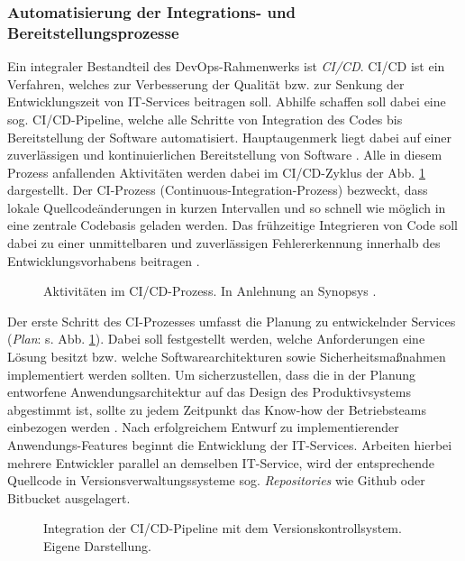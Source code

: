 \subsubsection{Automatisierung der Integrations- und Bereitstellungsprozesse}
\label{sec:CICD}
 Ein integraler Bestandteil des DevOps-Rahmen\-werks ist \textit{\ac{CI/CD}}. CI/CD ist ein Verfahren, welches zur Verbesserung der Qualität bzw. zur Senkung der Entwicklungszeit von IT-Services beitragen soll. Abhilfe schaffen soll dabei eine sog. CI/CD-Pipeline, welche alle Schritte von Integration des Codes  bis Bereitstellung der Software automatisiert. Hauptaugenmerk liegt dabei auf einer zuverlässigen und kontinuierlichen Bereitstellung von Software \cite[471]{Zampetti.92720211012021}. Alle in diesem Prozess anfallenden Aktivitäten werden dabei im CI/CD-Zyklus der Abb. \ref{fig:CICD_Cycle} dargestellt. Der \acs{CI}-Prozess (Continuous-Integration-Prozess) bezweckt, dass lokale Quellcode\-änderungen in kurzen Intervallen und so schnell wie möglich in eine zentrale Codebasis geladen werden. Das frühzeitige Integrieren von Code soll dabei zu einer unmittelbaren und zuverlässigen Fehlererkennung innerhalb des Entwicklungsvorhabens beitragen \cite[471]{Zampetti.92720211012021}. 
 \begin{center}
	\begin{figure}[H]
		\centering
		\captionsetup{format=myformat}
		\caption[Aktivitäten im CI/CD-Prozess]{Aktivitäten im CI/CD-Prozess. In Anlehnung an Synopsys \cite{.20230201}.}
		\label{fig:CICD_Cycle}
	\end{figure}
\end{center}
\vspace*{-15mm}
Der erste Schritt des CI-Prozesses umfasst die Planung zu entwickelnder Services (\textit{Plan}: s. Abb. \ref{fig:CICD_Cycle}). Dabei soll festgestellt werden, welche Anforderungen eine Lösung besitzt bzw. welche Softwarearchitekturen sowie Sicherheitsmaßnahmen implementiert werden sollten. Um sicherzustellen, dass die in der Planung entworfene Anwendungsarchitektur auf das Design des Produktivsystems abgestimmt ist, sollte zu jedem Zeitpunkt das Know-how der Betriebsteams einbezogen werden \cite[16]{Halstenberg.2020}. Nach erfolgreichem Entwurf zu implementierender Anwendungs-Features beginnt die Entwicklung der IT-Services. Arbeiten hierbei mehrere Entwickler parallel an demselben IT-Service, wird der entsprechende Quellcode in Versionsverwaltungssysteme sog. \textit{Repositories} wie Github oder Bitbucket ausgelagert.
\begin{center}
	\begin{figure}[H]
		\centering
		\caption[Integration der CI/CD-Pipeline mit dem Versionskontrollsystem]{Integration der CI/CD-Pipeline mit dem Versionskontrollsystem. Eigene Darstellung.}
		\label{fig:VCS}
	\end{figure}
\end{center}
